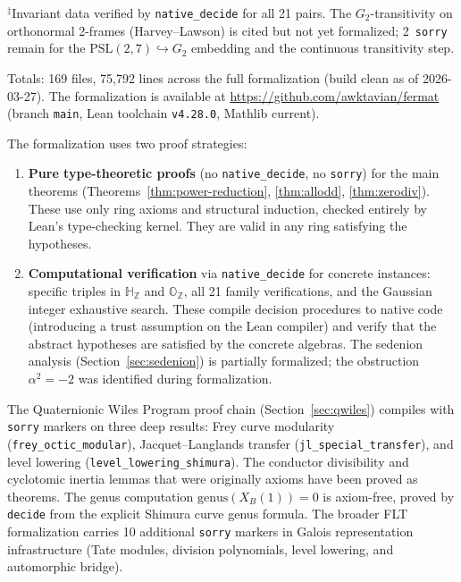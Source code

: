 \documentclass[11pt]{amsart}
\theoremstyle{plain}
\theoremstyle{definition}
\theoremstyle{remark}
\newcommand{\Z}{\mathbb{Z}}
\newcommand{\HH}{\mathbb{H}}
\newcommand{\OO}{\mathbb{O}}
\begin{document}
\smallskip\noindent
{\footnotesize ${}^\ddagger$Invariant data verified by \texttt{native\_decide}
for all 21 pairs. The $G_2$-transitivity on orthonormal 2-frames
(Harvey--Lawson) is cited but not yet formalized; 2~\texttt{sorry}
remain for the $\mathrm{PSL}(2,7) \hookrightarrow G_2$ embedding
and the continuous transitivity step.}

\noindent
Totals: 169 files, 75{,}792 lines across the full formalization
(build clean as of 2026-03-27).
The formalization is available at
\url{https://github.com/awktavian/fermat} (branch \texttt{main},
Lean toolchain \texttt{v4.28.0}, Mathlib current).

The formalization uses two proof strategies:
\begin{enumerate}
  \item \textbf{Pure type-theoretic proofs} (no \texttt{native\_decide},
    no \texttt{sorry}) for the main theorems
    (Theorems~\ref{thm:power-reduction}, \ref{thm:allodd}, \ref{thm:zerodiv}).
    These use only ring axioms and structural induction, checked entirely
    by Lean's type-checking kernel.
    They are valid in any ring satisfying the hypotheses.
  \item \textbf{Computational verification} via \texttt{native\_decide} for concrete instances:
    specific triples in $\HH_\Z$ and $\OO_\Z$, all 21 family verifications,
    and the Gaussian integer exhaustive search.
    These compile decision procedures to native code (introducing a trust
    assumption on the Lean compiler) and verify that the abstract hypotheses
    are satisfied by the concrete algebras.
    The sedenion analysis (Section~\ref{sec:sedenion}) is partially formalized;
    the obstruction $\alpha^2 = -2$ was identified during formalization.
\end{enumerate}

The Quaternionic Wiles Program proof chain (Section~\ref{sec:qwiles}) compiles with
\texttt{sorry} markers on three deep results: Frey curve modularity (\texttt{frey\_octic\_modular}),
Jacquet--Langlands transfer (\texttt{jl\_special\_transfer}),
and level lowering (\texttt{level\_lowering\_shimura}).
The conductor divisibility and cyclotomic inertia lemmas that were originally
axioms have been proved as theorems.
The genus computation $\mathrm{genus}(X_B(1)) = 0$ is axiom-free, proved by
\texttt{decide} from the explicit Shimura curve genus formula.
The broader FLT formalization carries 10 additional \texttt{sorry} markers in
Galois representation infrastructure (Tate modules, division polynomials,
level lowering, and automorphic bridge).
\end{document}
